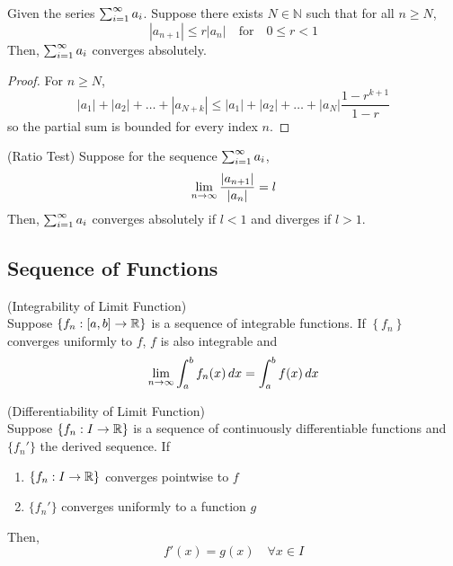 \documentclass{article}
\begin{document}
\begin{theorem}
    Given the series $\sum_{i=1}^\infty a_i$. Suppose there exists $N\in \mathbb{N}$ such that 
    for all $n\geq N$,
    \[ |a_{n+1}|\leq r|a_n| \quad \textrm{for} \quad 0\leq r < 1 \]
    Then, $\sum_{i=1}^\infty a_i$ converges absolutely.
\end{theorem}

\begin{proof}
    For $n\geq N$,
    \[ |a_1| + |a_2| + \hdots + |a_{N+k}| \leq |a_1| + |a_2| + \hdots + |a_N|\frac{1-r^{k+1}}{1-r} \]
    so the partial sum is bounded for every index $n$.
\end{proof}

\begin{theorem}
    (Ratio Test)
    Suppose for the sequence $\sum_{i=1}^\infty a_i$,
    \[ \lim_{n \to \infty} \frac{|a_{n+1}|}{|a_n|} = l\]
    Then, $\sum_{i=1}^\infty a_i$ converges absolutely if $l < 1$ and diverges if $l > 1$.
\end{theorem}

\subsection{Sequence of Functions}

\begin{theorem}
    (Integrability of Limit Function) \\
    Suppose $\{f_n:[a,b]\rightarrow \mathbb{R}\}$ is a sequence of integrable functions.
    If $\left\{ f_n \right\}$ converges uniformly to $f$, $f$ is also
    integrable and
    \[ \lim_{n \to \infty} \int_a^b f_n(x)\, dx = \int_a^b f(x)\, dx\]
\end{theorem}


\begin{theorem}
    (Differentiability of Limit Function) \\
    Suppose $\{f_n:I\rightarrow \mathbb{R}\}$ is a sequence of continuously differentiable
    functions and $\{f_n'\}$ the derived sequence. If
    \begin{enumerate}
        \item $\{f_n:I\rightarrow \mathbb{R}\}$ converges pointwise to $f$
        \item $\{f_n'\}$ converges uniformly to a function $g$
    \end{enumerate}
    Then,
    \[ f'(x) = g(x) \quad \forall x\in I\]
\end{theorem}
\end{document}
